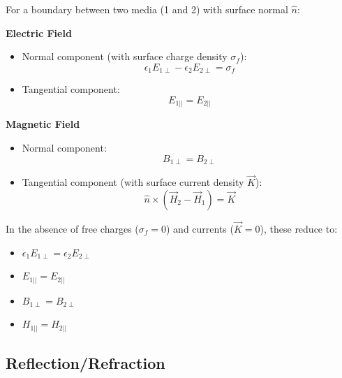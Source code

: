 \documentclass[
  a4paper,
]{book}
\providecommand{\tightlist}{%
  \setlength{\itemsep}{0pt}\setlength{\parskip}{0pt}}
\begin{document}
\begin{tcolorbox}[enhanced jigsaw, coltitle=black, title=\textcolor{quarto-callout-note-color}{\faInfo}\hspace{0.5em}{Summary Boundary Conditions at an Interface}, colframe=quarto-callout-note-color-frame, toprule=.15mm, opacitybacktitle=0.6, left=2mm, opacityback=0, breakable, toptitle=1mm, bottomtitle=1mm, leftrule=.75mm, arc=.35mm, titlerule=0mm, colbacktitle=quarto-callout-note-color!10!white, rightrule=.15mm, bottomrule=.15mm, colback=white]

For a boundary between two media (1 and 2) with surface normal
\(\hat{n}\):

\textbf{Electric Field}

\begin{itemize}
\tightlist
\item
  Normal component (with surface charge density \(\sigma_f\)):
  \[\epsilon_1 E_{1\perp} - \epsilon_2 E_{2\perp} = \sigma_f\]
\item
  Tangential component: \[E_{1||} = E_{2||}\]
\end{itemize}

\textbf{Magnetic Field}

\begin{itemize}
\tightlist
\item
  Normal component: \[B_{1\perp} = B_{2\perp}\]
\item
  Tangential component (with surface current density \(\vec{K}\)):
  \[\hat{n} \times (\vec{H}_2-\vec{H}_1)=\vec{K}\]
\end{itemize}

In the absence of free charges (\(\sigma_f = 0\)) and currents
(\(\vec{K} = 0\)), these reduce to:

\begin{itemize}
\tightlist
\item
  \(\epsilon_1 E_{1\perp} = \epsilon_2 E_{2\perp}\)
\item
  \(E_{1||} = E_{2||}\)
\item
  \(B_{1\perp} = B_{2\perp}\)
\item
  \(H_{1||} = H_{2||}\)
\end{itemize}

\end{tcolorbox}

\subsection{Reflection/Refraction}\label{reflectionrefraction}
\end{document}

